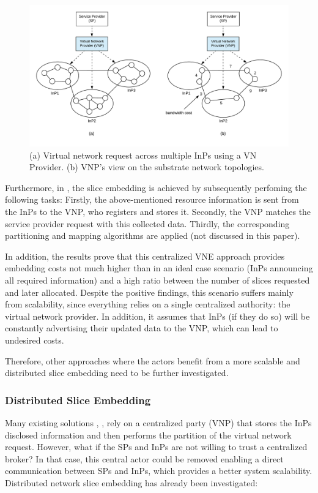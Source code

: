 \begin{figure}
	\centering
	\includegraphics[width=0.9\linewidth]{gfx/multiprov.png}    
  \caption{(a) Virtual network request across multiple InPs using a VN Provider. (b) VNP's view on the substrate network topologies. \citep{dietrich2015multi}}
  \label{fig:multiprov}
\end{figure}

Furthermore, in \citep{dietrich2015multi}, the slice embedding is achieved by subsequently perfoming the following tasks: Firstly, the above-mentioned resource information is sent from the InPs to the VNP, who registers and stores it. Secondly, the VNP matches the service provider request with this collected data. Thirdly, the corresponding partitioning and mapping algorithms are applied (not discussed in this paper). 

In addition, the results prove that this centralized VNE approach provides embedding costs not much higher than in an ideal case scenario (InPs announcing all required information) and a high ratio between the number of slices requested and later allocated. Despite the positive findings, this scenario suffers mainly from scalability, since everything relies on a single centralized authority: the virtual network provider. In addition, it assumes that InPs (if they do so) will be constantly advertising their updated data to the VNP, which can lead to undesired costs.

Therefore, other approaches where the actors benefit from a more scalable and distributed slice embedding need to be further investigated.

\subsubsection{Distributed Slice Embedding}

Many existing solutions \citep{houidi2011virtual}, \citep{dietrich2015multi}, \citep{dietrich2017multi} rely on a centralized party (VNP) that stores the InPs disclosed information and then performs the partition of the virtual network request. However, what if the SPs and InPs are not willing to trust a centralized broker? In that case, this central actor could be removed enabling a direct communication between SPs and InPs, which provides a better system scalability. Distributed network slice embedding has already been investigated:

